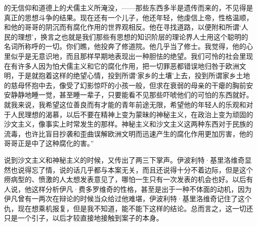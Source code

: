 的无信仰和道德上的犬儒主义所淹没，——那些东西多半是遗传而来的，不见得是真正的思想斗争的结果。现在还有一个儿子，他还年轻，他虔信上帝，性格温顺，和他的哥哥的阴沉而有腐化作用的世界观相反。他在寻找道路，以便附和所谓‘人民的理想’，换言之也就是我们那些有思想的知识阶层的理论界人士用这个聪明的名词所称呼的一切。你们瞧，他投奔了修道院。他几乎当了修士。我觉得，他的心里似乎是无意识地，而且那样早期地表现出一种胆怯的绝望。我们可怜的社会里现在有许多人因为怕犬儒主义和它的腐化作用，把一切罪恶都错误地归咎于欧洲文明，于是就抱着这样的绝望心情，投到所谓‘家乡的土壤’上去，投到所谓家乡土地的慈母怀抱中去，像受了幻影惊吓的小孩一般，但求在衰弱的母亲的干瘪的胸前安安静静地睡一觉，甚至睡一辈子，只要能看不见那些吓唬他们的可怕的东西就好。就我来说，我希望这位善良而有才能的青年前途无限，希望他的年轻人的乐观和对于人民理想的渴慕，以后不要在精神上变为蒙昧的神秘主义，在政治上变为顽固的沙文主义，像事实上时常发生的那样。神秘主义和沙文主义这两种东西对于民族的流毒，也许比盲目抄袭和歪曲误解欧洲文明而迅速产生的腐化作用更加厉害，他的哥哥正是中了这种腐化的害。”
\par 说到沙文主义和神秘主义的时候，又传出了两三下掌声。伊波利特·基里洛维奇显然也说得忘了情，说的话几乎都与本案无关，而且还说得十分不着边际，但是这个痨病型的、愤激的人太想发表意见了，哪怕一生只有一次发表的机会也好。以后有人说，他这样分析伊凡·费多罗维奇的性格，甚至是出于一种不体面的动机，因为伊凡曾有一两次在辩论的时候当众给过他难堪，伊波利特·基里洛维奇记住了这个仇，现在想乘机报复，但是我不知道，能不能下这样的结论。总而言之，这一切还只是一个引子，以后才较直接地接触到案子的本身。

